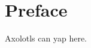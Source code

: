 \documentclass[../main.tex]{subfiles}
\begin{document}
\chapter*{Preface}

Axolotls can yap here.
\end{document}
